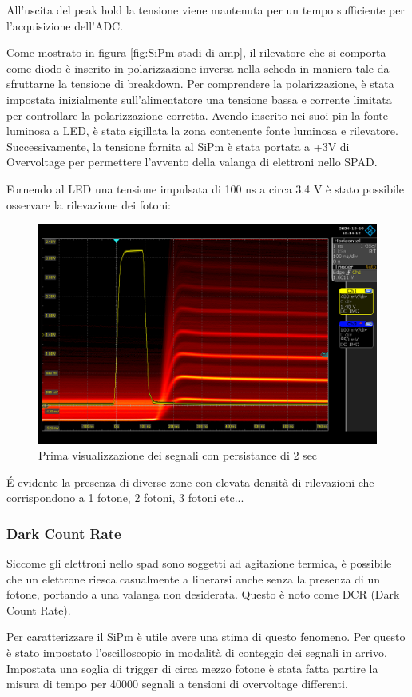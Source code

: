 All'uscita del peak hold la tensione viene mantenuta per un tempo sufficiente per l'acquisizione dell'ADC.

Come mostrato in figura \ref{fig:SiPm stadi di amp}, il rilevatore che si comporta come diodo è inserito in polarizzazione inversa nella scheda in maniera tale da sfruttarne la tensione di breakdown. Per comprendere la polarizzazione, è stata impostata inizialmente sull'alimentatore una tensione bassa e corrente limitata per controllare la polarizzazione corretta. Avendo inserito nei suoi pin la fonte luminosa a LED, è stata sigillata la zona contenente fonte luminosa e rilevatore. Successivamente, la tensione fornita al SiPm è stata portata a +3V di Overvoltage per permettere l'avvento della valanga di elettroni nello SPAD.

Fornendo al LED una tensione impulsata di 100 ns a circa 3.4 V è stato possibile osservare la rilevazione dei fotoni:

\begin{figure}[!h]
    \centering
    \includegraphics[width=0.5\linewidth]{assets/SiPm/SiPm.png}
    \caption{Prima visualizzazione dei segnali con persistance di 2 sec}
\end{figure}

\'E evidente la presenza di diverse zone con elevata densità di rilevazioni che corrispondono a 1 fotone, 2 fotoni, 3 fotoni etc...

\subsubsection{Dark Count Rate}
Siccome gli elettroni nello spad sono soggetti ad agitazione termica, è possibile che un elettrone riesca casualmente a liberarsi anche senza la presenza di un fotone, portando a una valanga non desiderata. Questo è noto come DCR (Dark Count Rate).

Per caratterizzare il SiPm è utile avere una stima di questo fenomeno. Per questo è stato impostato l'oscilloscopio in modalità di conteggio dei segnali in arrivo. Impostata una soglia di trigger di circa mezzo fotone è stata fatta partire la misura di tempo per 40000 segnali a tensioni di overvoltage differenti.

